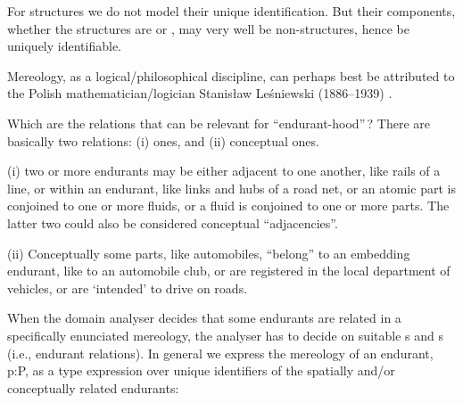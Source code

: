 
\begynd
\pind For structures we do not model their unique identification.
\begynd
\pind But their components, 
\begynd
\pind whether the structures are 
\pind or ,
\afslut
\pind may very well be non-structures, hence be uniquely identifiable.
\afslut
\afslut

\label{refUIDs.n}\label{ch2.uid.n}

\label{chap4.Mereology}



\noindent
\begynd
\pind Mereology, as a logical/phi\-lo\-so\-phi\-cal discipline, \nyl
      can perhaps best be attributed to \nyl the Polish
      math\-e\-ma\-ti\-ci\-an/\-lo\-gi\-ci\-an  \nyl
      Stanis{\l}aw Le{\'s}niewski (1886--1939) \cite{CasatiVarzi1999,BjornerMereology2013}.
\afslut

\label{Shared Attribute Mereology.1}

\begynd
\pind Which are the relations \nyl that can be relevant for ``endurant-hood''\,?
\pind There are basically two relations:
\begynd
\pind (i)  ones, and
\pind (ii) conceptual ones.
\afslut
\afslut

\begynd
\pind (i)  two or more endurants may be  
\begynd
\pind either adjacent to one another, like rails of a line, 
\pind or within an endurant, like links and hubs of a road net,
\pind or an atomic part is conjoined to one or more fluids,
\pind or a fluid is conjoined to one or more parts.
\afslut
\mnewfoil
\pind The latter two could also be considered \nyl  conceptual ``adjacencies''.

\pind (ii) Conceptually some parts, like automobiles,
\begynd
\pind ``belong'' to an embedding endurant,
\begynd
\pind like to an automobile club, or
\pind are registered in the local department of vehicles, 
\afslut
\pind or are `intended' to drive on roads.
\afslut
\afslut

\label{s.refPM:TaF}

\begynd
\pind When the domain analyser decides that 
\begynd
\pind some endurants are related in \nyl  a specifically enunciated mereology, 
\pind the analyser has to decide on suitable
\begynd
\pind {}s and
\pind {}s (i.e., endurant relations).
\afslut
\afslut
\mnewfoil
\pind In general we express the mereology of an endurant, \textsf{p:P}, 
\begynd
\pind as a\ysfchg{ } type expression
\pind over unique identifiers 
\pind of the spatially and/or conceptually related endurants:
\afslut

